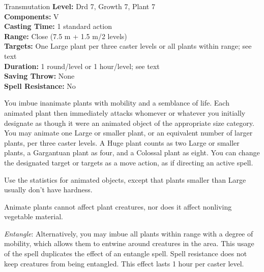 {Transmutation}
{
	\textbf{Level:}
	Drd 7, Growth 7, Plant 7\\
	\textbf{Components:}
	V\\
	\textbf{Casting Time:}
	1 standard action\\
	\textbf{Range:}
	Close (7.5 m + 1.5 m/2 levels)\\
	\textbf{Targets:}
	One Large plant per three caster levels or all plants within range; see text\\
	\textbf{Duration:}
	1 round/level or 1 hour/level; see text\\
	\textbf{Saving Throw:}
	None\\
	\textbf{Spell Resistance:}
	No\\
}
{
	You imbue inanimate plants with mobility and a semblance of life. Each animated plant then immediately attacks whomever or whatever you initially designate as though it were an animated object of the appropriate size category. You may animate one Large or smaller plant, or an equivalent number of larger plants, per three caster levels. A Huge plant counts as two Large or smaller plants, a Gargantuan plant as four, and a Colossal plant as eight. You can change the designated target or targets as a move action, as if directing an active spell.

	Use the statistics for animated objects, except that plants smaller than Large usually don't have hardness.

	Animate plants cannot affect plant creatures, nor does it affect nonliving vegetable material.

	\textit{Entangle}:
	Alternatively, you may imbue all plants within range with a degree of mobility, which allows them to entwine around creatures in the area. This usage of the spell duplicates the effect of an entangle spell. Spell resistance does not keep creatures from being entangled. This effect lasts 1 hour per caster level.

}
